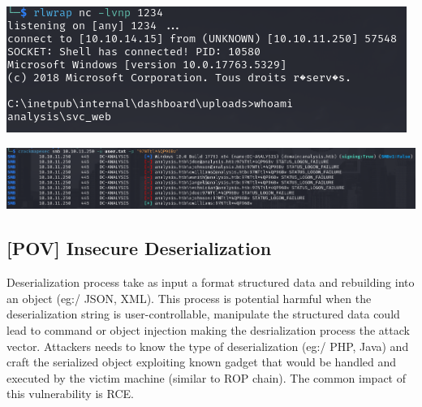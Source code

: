 \documentclass[a4paper]{article}
\begin{document}
              \begin{minipage}[c]{\textwidth}
          \centering
          \includegraphics[width=\textwidth]{src/issues/1 - ANALYSIS/issue14.png}
          \label{1:ANALYSIS:issue.md:issue14.png}
          \vspace{4ex}
        \end{minipage}
              \begin{minipage}[c]{\textwidth}
          \centering
          \includegraphics[width=\textwidth]{src/issues/1 - ANALYSIS/issue15.png}
          \label{1:ANALYSIS:issue.md:issue15.png}
          \vspace{4ex}
        \end{minipage}
          
    \clearpage

    

      \newpage
    
    \subsection{[POV] Insecure Deserialization}
    \label{2:POV:issue.md}

    Deserialization process take as input a format structured data and rebuilding into an object (eg:/ JSON, XML).
This process is potential harmful when the deserialization string is user-controllable, manipulate the structured data
could lead to command or object injection making the desrialization process the attack vector. Attackers needs to know the
type of deserialization (eg:/ PHP, Java) and craft the serialized object exploiting known gadget that would be handled and
executed by the victim machine (similar to ROP chain). The common impact of this vulnerability is RCE.
\end{document}
